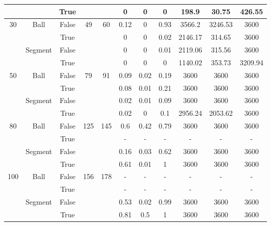 \documentclass[a4paper,  review, authoryear, 1p.]{elsarticle}
\begin{document}
\begin{table}[htbp]
{\begin{tabular}{|c|c|c||cc|ccc|ccc|}
				&       & True  &       &       & 0     & 0     & 0     & 198.9 & 30.75 & 426.55 \bigstrut[b]\\
				\hline
				\hline
				\multirow{4}[4]{*}{30} & \multirow{2}[2]{*}{Ball} & False & \multirow{4}[4]{*}{49} & \multirow{4}[4]{*}{60} & 0.12  & 0     & 0.93  & 3566.2 & 3246.53 & 3600 \bigstrut[t]\\
				&       & True  &       &       & 0     & 0     & 0.02  & 2146.17 & 314.65 & 3600 \bigstrut[b]\\
				\cline{2-3}\cline{6-11}          & \multirow{2}[2]{*}{Segment} & False &       &       & 0     & 0     & 0.01  & 2119.06 & 315.56 & 3600 \bigstrut[t]\\
				&       & True  &       &       & 0     & 0     & 0     & 1140.02 & 353.73 & 3209.94 \bigstrut[b]\\
				\hline
				\hline
				\multirow{4}[4]{*}{50} & \multirow{2}[2]{*}{Ball} & False & \multirow{4}[4]{*}{79} & \multirow{4}[4]{*}{91} & 0.09  & 0.02  & 0.19  & 3600  & 3600  & 3600 \bigstrut[t]\\
				&       & True  &       &       & 0.08  & 0.01  & 0.21  & 3600  & 3600  & 3600 \bigstrut[b]\\
				\cline{2-3}\cline{6-11}          & \multirow{2}[2]{*}{Segment} & False &       &       & 0.02  & 0.01  & 0.09  & 3600  & 3600  & 3600 \bigstrut[t]\\
				&       & True  &       &       & 0.02  & 0     & 0.1   & 2956.24 & 2053.62 & 3600 \bigstrut[b]\\
				\hline
				\hline
				\multirow{4}[4]{*}{80} & \multirow{2}[2]{*}{Ball} & False & \multirow{4}[4]{*}{125} & \multirow{4}[4]{*}{145} & 0.6   & 0.42  & 0.79  & 3600  & 3600  & 3600 \bigstrut[t]\\
				&       & True  &       &       & -     & -     & -     & -     & -     & - \bigstrut[b]\\
				\cline{2-3}\cline{6-11}          & \multirow{2}[2]{*}{Segment} & False &       &       & 0.16  & 0.03  & 0.62  & 3600  & 3600  & 3600 \bigstrut[t]\\
				&       & True  &       &       & 0.61  & 0.01  & 1     & 3600  & 3600  & 3600 \bigstrut[b]\\
				\hline
				\hline
				\multirow{4}[4]{*}{100} & \multirow{2}[2]{*}{Ball} & False & \multirow{4}[4]{*}{156} & \multirow{4}[4]{*}{178} & -     & -     & -     & -     & -     & - \bigstrut[t]\\
				&       & True  &       &       & -     & -     & -     & -     & -     & - \bigstrut[b]\\
				\cline{6-11}          & \multirow{2}[2]{*}{Segment} & False &       &       & 0.53  & 0.02  & 0.99  & 3600  & 3600  & 3600 \bigstrut[t]\\
				&       & True  &       &       & 0.81  & 0.5   & 1     & 3600  & 3600  & 3600 \bigstrut[b]\\
				\hline
		\end{tabular}}%
		\label{table:results}%
	\end{table}%
	
\end{document}
